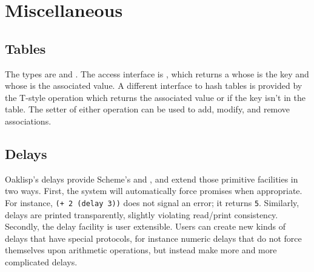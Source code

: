 %
%
%


\chapter{Miscellaneous} \label{misc}

\section{Tables}

The types are  and .  The
access interface is , which returns a  whose
 is the key and whose  is the associated value.  A
different interface to hash tables is provided by the T-style
 operation which returns the associated value or
 if the key isn't in the table.  The setter of either
operation can be used to add, modify, and remove associations.







\section{Delays}

Oaklisp's delays provide Scheme's  and , and
extend those primitive facilities in two ways.  First, the system will
automatically force promises when appropriate.  For instance, \texttt{(+
2 (delay 3))} does not signal an error; it returns \texttt{5}.
Similarly, delays are printed transparently, slightly violating
read/print consistency.  Secondly, the delay facility is user
extensible.  Users can create new kinds of delays that have special
protocols, for instance numeric delays that do not force themselves
upon arithmetic operations, but instead make more and more complicated
delays.


